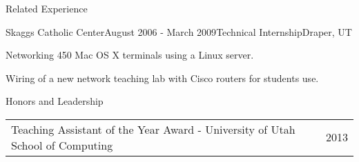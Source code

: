 \documentclass{resume}
\begin{document}
\begin{relatedExperience}
\begin{rSection}{Related Experience}

\begin{experienceJdIntern}
\begin{rSubsection}{Skaggs Catholic Center}{August 2006 - March 2009}{Technical Internship}{Draper, UT}
\item Networking 450 Mac OS X terminals using a Linux server.
\item Wiring of a new network teaching lab with Cisco routers for students use.
\end{rSubsection}
\end{experienceJdIntern}

\end{rSection}
\end{relatedExperience}


\begin{honors}
\begin{rSection}{Honors and Leadership}
\begin{tabularx}{\textwidth}{ l l }
Teaching Assistant of the Year Award - University of Utah School of Computing & 2013 \\
\end{tabularx}

\end{rSection}
\end{honors}
\end{document}

